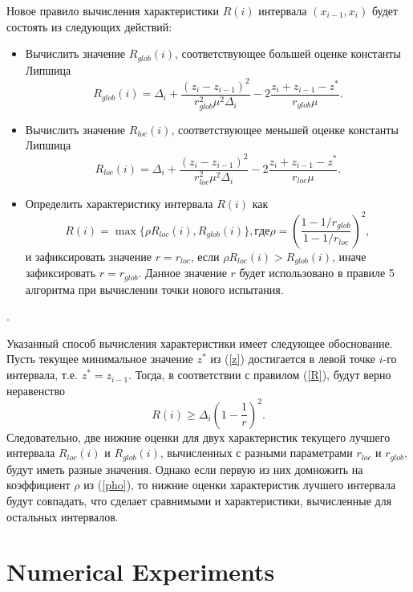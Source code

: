 \documentclass[runningheads]{llncs}
\begin{document}
Новое правило вычисления характеристики $R(i)$ интервала $(x_{i-1}, x_i)$ будет состоять из следующих действий:
\begin{itemize}
\item
Вычислить значение $R_{glob}(i)$, соответствующее большей оценке константы Липшица
\[
R_{glob}(i)=\Delta_i+\frac{(z_i-z_{i-1})^2}{r_{glob}^2\mu^2\Delta_i}-2\frac{z_i+z_{i-1}-z^*}{r_{glob}\mu}.
\]
\item
Вычислить значение $R_{loc}(i)$, соответствующее меньшей оценке константы Липшица
\[
R_{loc}(i)=\Delta_i+\frac{(z_i-z_{i-1})^2}{r_{loc}^2\mu^2\Delta_i}-2\frac{z_i+z_{i-1}-z^*}{r_{loc}\mu}.
\]
\item
Определить характеристику интервала $R(i)$ как
\begin{equation}\label{pho}
R(i) = \max\{\rho R_{loc}(i),R_{glob}(i)\}, где \rho = \left(\frac{1-1/r_{glob}}{1-1/r_{loc}}\right)^2,
\end{equation}
и зафиксировать значение $r = r_{loc}$, если  $\rho R_{loc}(i) > R_{glob}(i)$, иначе зафиксировать $r=r_{glob}$.
Данное значение $r$ будет использовано в правиле 5 алгоритма при вычислении точки нового испытания.   
\end{itemize}.

Указанный способ вычисления характеристики имеет следующее обоснование. 
Пусть текущее минимальное значение $z^*$ из (\ref{z}) достигается в левой точке $i$-го интервала, т.е. $z^* = z_{i-1}$. Тогда, в соответствии с правилом (\ref{R}), будут верно неравенство
\[
R(i) \geq \Delta_i \left( 1 - \frac{1}{r} \right)^2.
\]
Следовательно, две нижние оценки для двух характеристик текущего лучшего интервала $R_{loc}(i)$ и $R_{glob}(i)$, вычисленных с разными параметрами $r_{loc}$ и $r_{glob}$, будут иметь разные значения.
Однако если первую из них домножить на коэффициент $\rho$ из (\ref{pho}), то нижние оценки характеристик лучшего интервала будут совпадать, что сделает сравнимыми и характеристики, вычисленные для остальных интервалов.

\section{Numerical Experiments}
\end{document}
